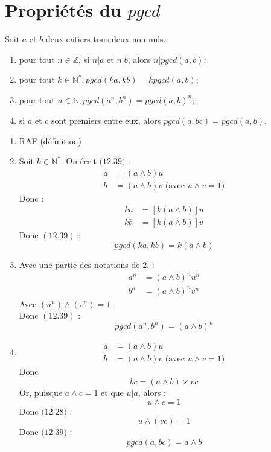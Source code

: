 \documentclass[../main.tex]{subfiles}
\begin{document}
\section{Propriétés du $pgcd$}
\begin{tcolorbox}[title=Propostion 12.40, title filled=false, colframe=lightblue, colback=lightblue!10!white]
    Soit $a$ et $b$ deux entiers tous deux non nuls. 
    \begin{enumerate}
        \item pour tout $n \in \mathbb{Z}$, si $n|a$ et $n|b$, alors $n|pgcd(a,b)$;
        \item pour tout $k \in \mathbb{N}^*, pgcd(ka, kb) = kpgcd(a,b)$;
        \item pour tout $n \in \mathbb{N}, pgcd(a^n, b^n) = pgcd(a,b)^n$;
        \item si $a$ et $c$ sont premiers entre eux, alors $pgcd(a,bc) = pgcd(a,b)$.
    \end{enumerate}
\end{tcolorbox}

\begin{enumerate}
    \item RAF (définition)
    \item Soit $k \in \mathbb{N}^*$. On écrit $\text{(12.39)}$ : 
    \begin{align*}
        a &= (a \wedge b)u \\
        b &= (a \wedge b)v \text{ (avec $u \wedge v = 1$)}
    \end{align*}
    Donc : 
    \begin{align*}
        ka &= \left[ k(a \wedge b) \right]u \\
        kb &= \left[ k(a \wedge b) \right]v
    \end{align*}
    Donc $(12.39)$ : 
    $$pgcd(ka, kb) = k(a \wedge b)$$

    \item Avec une partie des notations de $2.$ : 
    \begin{align*}
        a^n &= (a \wedge b)^n u^n \\
        b^n &= (a \wedge b)^n v^n
    \end{align*}
    Avec $(u^n) \wedge (v^n) = 1$. \\
    Donc $(12.39)$ :
    $$pgcd(a^n, b^n) = (a \wedge b)^n$$

    \item \begin{align*}
        a &= (a \wedge b)u \\
        b &= (a \wedge b)v \text{ (avec $u \wedge v = 1$)}
    \end{align*}
    Donc
    $$bc = (a \wedge b) \times vc$$
    Or, puisque $a \wedge c = 1$ et que $u | a$, alors : 
    $$u \wedge c = 1$$
    Donc $\text{(12.28)}$ :
    $$u \wedge (vc) = 1$$
    Donc $\text{(12.39)}$ :
    $$pgcd(a, bc) = a \wedge b$$
\end{enumerate}
\end{document}
